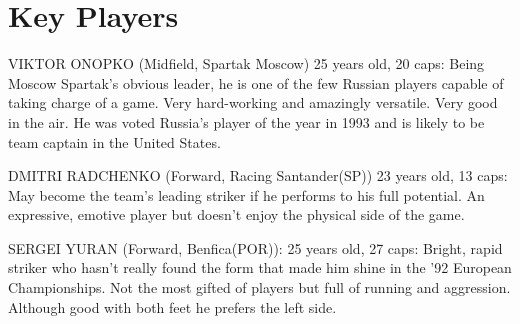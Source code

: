 \section{Key Players}
VIKTOR ONOPKO (Midfield, Spartak Moscow) 25 years old, 20 caps:
Being Moscow Spartak's obvious leader, he is one of the few Russian players 
capable of taking charge of a game. Very hard-working and amazingly versatile. 
Very good in the air. He was voted Russia's player of the year in 1993 and is 
likely to be team captain in the United States.

DMITRI RADCHENKO (Forward, Racing Santander(SP)) 23 years old, 13 caps:
May become the team's leading striker if he performs to his full potential. An 
expressive, emotive player but doesn't enjoy the physical side of the game.

SERGEI YURAN (Forward, Benfica(POR)): 25 years old, 27 caps:
Bright, rapid striker who hasn't really found the form that made him shine in
the '92 European Championships. Not the most gifted of players but full of
running and aggression. Although good with both feet he prefers the left side.
